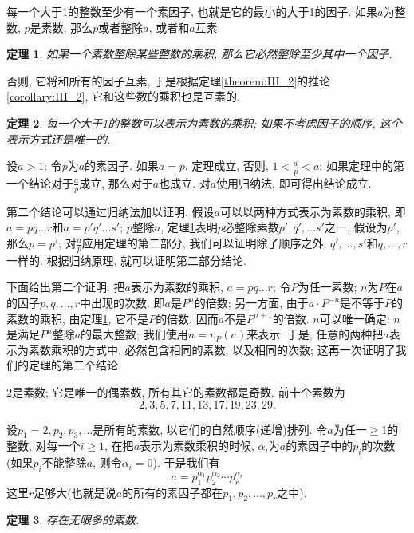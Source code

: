 \documentclass[12pt,a4paper]{book} %
\newtheorem{theorem}{定理}
\theoremstyle{remark}
\theoremstyle{example}
\theoremstyle{lemma}
\theoremstyle{corollary}
\numberwithin{theorem}{chapter}
\begin{document}
每一个大于1的整数至少有一个素因子, 也就是它的最小的大于1的因子. 如果$a$为整数, $p$是素数, 那么$p$或者整除$a$, 或者和$a$互素.

\begin{theorem} \label{theorem:IV_1}
如果一个素数整除某些整数的乘积, 那么它必然整除至少其中一个因子.
\end{theorem}

否则, 它将和所有的因子互素, 于是根据定理\ref{theorem:III_2}的推论\ref{corollary:III_2}, 它和这些数的乘积也是互素的.

\begin{theorem} \label{theorem:IV_2}
每一个大于1的整数可以表示为素数的乘积; 如果不考虑因子的顺序, 这个表示方式还是唯一的.
\end{theorem}

设$a > 1$; 令$p$为$a$的素因子. 如果$a = p$, 定理成立, 否则, $1 < \frac{a}{p} < a$; 如果定理中的第一个结论对于$\frac{a}{p}$成立, 那么对于$a$也成立. 对$a$使用归纳法, 即可得出结论成立.

第二个结论可以通过归纳法加以证明. 假设$a$可以以两种方式表示为素数的乘积, 即$a = pq \ldots r$和$a = p'q' \ldots s'$; $p$整除$a$, 定理\ref{theorem:IV_1}表明$p$必整除素数$p', q', \ldots s'$之一, 假设为$p'$, 那么$p = p'$; 对$\frac{a}{p}$应用定理的第二部分, 我们可以证明除了顺序之外, $q', \ldots, s'$和$q, \ldots, r$一样的. 根据归纳原理, 就可以证明第二部分结论.

下面给出第二个证明. 把$a$表示为素数的乘积, $a = pq \ldots r$; 令$P$为任一素数; $n$为$P$在$a$的因子$p, q, \ldots, r$中出现的次数. 即$a$是$P^n$的倍数; 另一方面, 由于$a \cdot P^{-n}$是不等于$P$的素数的乘积, 由定理\ref{theorem:IV_1}, 它不是$P$的倍数, 因而$a$不是$P^{n + 1}$的倍数. $n$可以唯一确定: $n$是满足$P^n$整除$a$的最大整数; 我们使用$n = \upsilon_{P}(a)$来表示. 于是, 任意的两种把$a$表示为素数乘积的方式中, 必然包含相同的素数, 以及相同的次数; 这再一次证明了我们的定理的第二个结论.

2是素数; 它是唯一的偶素数, 所有其它的素数都是奇数. 前十个素数为
\[
2, 3, 5, 7, 11, 13, 17, 19, 23, 29.
\]

设$p_1 = 2, p_2, p_3, \ldots$是所有的素数, 以它们的自然顺序(递增)排列. 令$a$为任一$\ge$1的整数, 对每一个$i \ge 1$, 在把$a$表示为素数乘积的时候, $\alpha_i$为$a$的素因子中的$p_i$的次数(如果$p_i$不能整除$a$, 则令$\alpha_i = 0$). 于是我们有
\[
a = p_1^{\alpha_1}p_2^{\alpha_2} \cdots p_r^{\alpha_r}
\]
这里$r$足够大(也就是说$a$的所有的素因子都在$p_1, p_2, \ldots, p_r$之中).

\begin{theorem} \label{theorem:IV_3}
存在无限多的素数.
\end{theorem}
\end{document}
